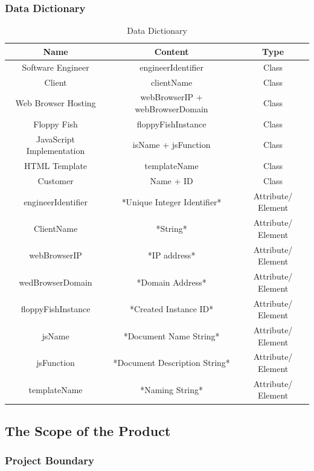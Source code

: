 \documentclass[11pt, oneside]{article}   	%
\begin{document}
\subsubsection*{Data Dictionary}
\begin{table}[H]
\caption{Data Dictionary}
\begin{center}
\begin{tabular}{|c|c|c|}
\hline
Name & Content &Type\\
\hline
Software Engineer & engineerIdentifier & Class\\
\hline
Client & clientName	& Class\\
\hline
Web Browser Hosting & webBrowserIP + webBrowserDomain	& Class\\
\hline
Floppy Fish & floppyFishInstance & Class\\
\hline
JavaScript Implementation & isName + jsFunction & Class\\
\hline
HTML Template	 & templateName & Class\\
\hline
Customer	& Name + ID & Class\\
\hline
engineerIdentifier & *Unique Integer Identifier* & Attribute/ Element\\
\hline
ClientName & *String* & Attribute/ Element\\
\hline
webBrowserIP & *IP address* & Attribute/ Element\\
\hline
wedBrowserDomain & *Domain Address* & Attribute/ Element\\
\hline
floppyFishInstance & *Created Instance ID* & Attribute/ Element\\
\hline
jsName & *Document Name String*	& Attribute/ Element\\
\hline
jsFunction	& *Document Description String* & Attribute/ Element\\
\hline
templateName & *Naming String* & Attribute/ Element\\
\hline
\end{tabular}
\end{center}
\label{default}
\end{table}%



\subsection*{The Scope of the Product}
\subsubsection*{Project Boundary}
\end{document}
